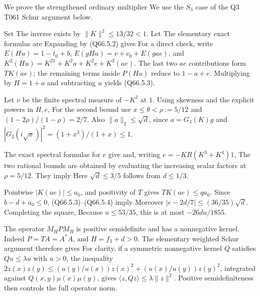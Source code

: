 We prove the strengthened ordinary multiplier
We use the \(S_3\) case of the Q3 T061 Schur argument below.

Set
The inverse exists by \(\|K\|^2\le13/32<1\).
Let
The elementary exact formulas are
Expanding by (Q66.5.2) gives
For a direct check, write
\(E(Hu)=1-t_0+b\),
\(E(gHu)=v+c_0+E(gae)\), and
\(K^2(Hu)=K^21+K^2a+K^2e+K^2(ae)\).
The last two \(ae\) contributions form \(TK(ae)\);
the remaining terms inside \(P(Hu)\) reduce to \(1-a+e\).
Multiplying by \(H=1+a\) and subtracting \(u\) yields (Q66.5.3).

Let \(\nu\) be the finite spectral measure of \(-K^2\) at \(1\).
Using skewness and the explicit powers in \(H,\allowbreak  e\),
For the second bound use \(x\le\theta<\rho:=5/12\) and
\((1-2\rho)/(1-\rho)=2/7\).
Also \(\|a\|_2\le\sqrt d\), since
\(a=G_3(K)g\) and \(|G_3(i\sqrt x)|^2=(1+x^3)/(1+x)\le1\).

The exact spectral formulas for \(e\) give
and, writing \(e=-KR(K^3+K^4)1\),
The two rational bounds are obtained by evaluating the increasing
scalar factors at \(\rho=5/12\). They imply
Here \(\sqrt d\le3/5\) follows from \(d\le1/3\).

Pointwise \(|K(ae)|\le a_0\), and positivity of \(T\) gives
\(TK(ae)\le q a_0\). Since \(b-d+a_0\le0\), (Q66.5.3)--(Q66.5.4) imply
Moreover \(|e-2d/7|\le(36/35)\sqrt d\). Completing the square,
Because \(u\le53/35\), this is at most
\(-26du/1855\).

The operator \(M_H P M_H\) is positive semidefinite and has a
nonnegative kernel. Indeed \(P=T A=A^*A\), and \(H=f_3+d>0\).
The elementary weighted Schur argument therefore gives
For clarity, if a symmetric nonnegative kernel \(Q\) satisfies
\(Qu\le\lambda u\) with \(u>0\), the inequality
\(2z(x)z(y)\le(u(y)/u(x))z(x)^2+(u(x)/u(y))z(y)^2\), integrated against
\(Q(x,\allowbreak  y)\mu(x)\mu(y)\), gives
\(\langle z,\allowbreak  Qz\rangle\le\lambda\|z\|^2\).
Positive semidefiniteness then controls the full operator norm.

